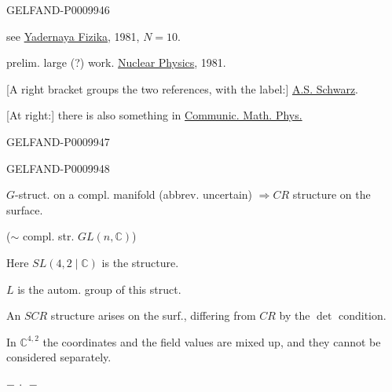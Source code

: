 \begin{GelfandAdjacentEvidence}{GELFAND-P000994}{6}


see \underline{Yadernaya Fizika}, 1981, $N=10$.

prelim. large (?) work. \underline{Nuclear Physics}, 1981.

[A right bracket groups the two references, with the label:] \underline{A.S. Schwarz}.

[At right:] there is also something in \underline{Communic. Math. Phys.}
\end{GelfandAdjacentEvidence}
\begin{GelfandAdjacentEvidence}{GELFAND-P000994}{7}

\end{GelfandAdjacentEvidence}
\begin{GelfandAdjacentEvidence}{GELFAND-P000994}{8}


$G$-struct. on a compl. manifold (abbrev. uncertain) $\Rightarrow CR$ structure on the surface.
\end{GelfandAdjacentEvidence}


($\sim$ compl. str. $GL(n,\mathbb C)$)

Here $SL(4,2\mid\mathbb C)$ is the structure.

$L$ is the autom. group of this struct.

An $SCR$ structure arises on the surf., differing from $CR$ by the $\det$ condition.

In $\mathbb C^{4,2}$ the coordinates and the field values are mixed up, and they cannot be considered separately.

\begin{center}$-\ \cdot\ -$\end{center}


